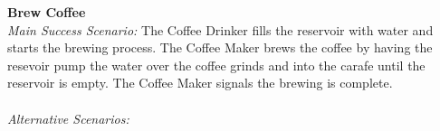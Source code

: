 \documentclass[letterpaper]{article}
\begin{document}
\noindent
\textbf{Brew Coffee}\\
\textit{Main Success Scenario:  }  The Coffee Drinker fills the
reservoir with water and starts the brewing process.  The Coffee Maker
brews the coffee by having the resevoir pump the water over
the coffee grinds and into the carafe until the reservoir is empty.
The Coffee Maker signals the brewing is complete.\\\\
\textit{Alternative Scenarios:  }
\end{document}
